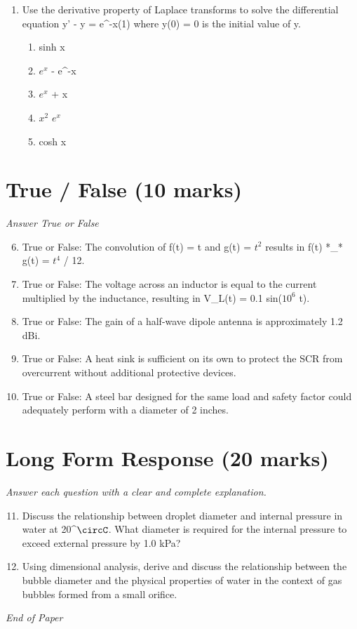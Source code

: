 \documentclass[12pt]{article}
\begin{document}
\begin{enumerate}[label=\arabic*.]
\begin{enumerate}[label=(\alph*)]
    \item L\{t\} = (1 / $s^3$)
    \item L\{t\} = $s^2$
    \item L\{t\} = (1 / (2 $s^2$))
    \item L\{t\} = (1 / $s^2$)
\end{enumerate}
\item Use the derivative property of Laplace transforms to solve the differential equation y' - y = e^-x(1) where y(0) = 0 is the initial value of y.
\begin{enumerate}[label=(\alph*)]
    \item sinh x
    \item $e^x$ - e^-x
    \item $e^x$ + x
    \item $x^2$ $e^x$
    \item cosh x
\end{enumerate}
\end{enumerate}

\section*{True / False (10 marks)}
\textit{Answer True or False}
\begin{enumerate}[label=\arabic*.]
\setcounter{enumi}{5}
\item True or False: The convolution of f(t) = t and g(t) = $t^2$ results in f(t) *\_* g(t) = $t^4$ / 12.
\item True or False: The voltage across an inductor is equal to the current multiplied by the inductance, resulting in V\_L(t) = 0.1 sin($10^6$ t).
\item True or False: The gain of a half-wave dipole antenna is approximately 1.2 dBi.
\item True or False: A heat sink is sufficient on its own to protect the SCR from overcurrent without additional protective devices.
\item True or False: A steel bar designed for the same load and safety factor could adequately perform with a diameter of 2 inches.
\end{enumerate}

\section*{Long Form Response (20 marks)}
\textit{Answer each question with a clear and complete explanation.}
\begin{enumerate}[label=\arabic*.]
\setcounter{enumi}{10}
\item Discuss the relationship between droplet diameter and internal pressure in water at 20^\ensuremath{\circC}. What diameter is required for the internal pressure to exceed external pressure by 1.0 kPa?
\item Using dimensional analysis, derive and discuss the relationship between the bubble diameter and the physical properties of water in the context of gas bubbles formed from a small orifice.
\end{enumerate}

\vfill
\noindent\textit{End of Paper}
\end{document}
